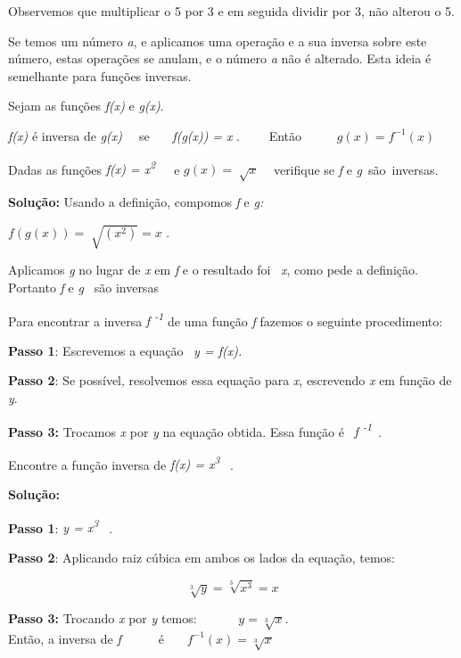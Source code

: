 Observemos que multiplicar o 5 por 3 e em seguida dividir por 3, não alterou o 5.

Se temos um número \textit{a}, e aplicamos uma operação e a sua inversa sobre este número, estas operações se anulam, e o número \textit{a} não é alterado. Esta ideia é semelhante para funções inversas.

\begin{caixa}
    \begin{tdefinicao}
        Sejam as funções \textit{f(x)} e \textit{g(x)}. 
    
        \textit{f(x)} é inversa de \textit{g(x)~~ }se~~~ \textit{f(g(x))} \textit{= x }.~~~~ Então~~~~~ \textit{  \( g \left( x \right) =f^{-1} \left( x \right)  \) }\qedsymbol{}
    \end{tdefinicao}
\end{caixa}

\begin{texemplo}
    Dadas as funções   \textit{f(x) = x\textsuperscript{2}}~~~e   \( g \left( x \right) =\sqrt[]{x} \) ~ verifique se \textit{f} e \textit{g}~são~inversas.   

    \textbf{Solução:  }Usando a definição, compomos\textbf{ }\textit{f} e \textit{g:}
    
    \( f \left( g \left( x \right)  \right) =\sqrt[]{ \left( x^{2} \right) }=x \) . 

    Aplicamos \textit{g} no lugar de \textit{x} em \textit{f} e o resultado foi~ \textit{x}, como pede a definição. Portanto \textit{f} e \textit{g~ }são inversas \qedsymbol{}

    Para encontrar a inversa \textit{f \textsuperscript{-1}} de uma função \textit{f} fazemos o seguinte procedimento:

    \textbf{Passo 1}: Escrevemos a equação~ \textit{y = f(x).}

    \textbf{Passo 2}: Se possível, resolvemos essa equação para \textit{x}, escrevendo \textit{x} em função de \textit{y}.

    \textbf{Passo 3: }Trocamos \textit{x} por \textit{y} na equação obtida. Essa função é~ \textit{f \textsuperscript{-1}}~.  

\end{texemplo}

\begin{texemplo}

    Encontre a função inversa de   \textit{f(x) = x\textsuperscript{3}}~ . 

    \textbf{Solução:  }

    \textbf{Passo 1}: \textit{y = x\textsuperscript{3}}~ \textit{.}

    \textbf{Passo 2}: Aplicando raiz cúbica em ambos os lados da equação, temos: 

    \[  \]  \[ \sqrt[3]{y}=\sqrt[3]{x^{3}}=x \] 

    \textbf{Passo 3: }Trocando \textit{x} por \textit{y}  temos:~~~~~~  \( y=\sqrt[3]{x}. \)  \[  \]  \[  \] Então, a inversa de \textit{f}~~~~~~é~~~   \( f^{-1} \left( x \right) =\sqrt[3]{x} \) ~~~ \qedsymbol{}
\end{texemplo}

